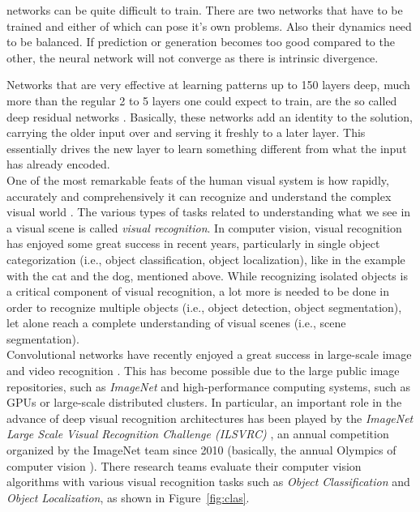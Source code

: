 \documentclass[12pt,a4paper]{report}
\newcommand{\term}{\textit}
\newcommand{\acronym}{\MakeUppercase}
\begin{document}
	networks can be quite difficult to train. There are two networks that have to be 
	trained and either of which can pose it’s own problems. Also their dynamics need 
	to be balanced. If prediction or generation becomes too good compared to the other, 
	the neural network will not converge as there is intrinsic divergence.
	\par
	Networks that are very effective at learning patterns up to 150 layers deep, much 
	more than the regular 2 to 5 layers one could expect to train, are the so called 
	deep residual networks \citep{He_resnet}. Basically, these networks add an identity 
	to the solution, carrying the older input over and serving it freshly to a later 
	layer. This essentially drives the new layer to learn something different from what 
	the input has already encoded. 
	\\
	
	One of the most remarkable feats of the human visual system is how rapidly, 
	accurately and comprehensively it can recognize and understand the complex visual 
	world \citep{Socher}. The various types of tasks related to understanding what 
	we see in a visual scene is called \term{visual recognition}. In computer vision, 
	visual recognition has enjoyed some great success in recent years, particularly 
	in single object categorization (i.e., object classification, object localization), 
	like in the example with the cat and the dog, mentioned above. 
	While recognizing isolated objects is a critical component of visual recognition, 
	a lot more is needed to be done in order to recognize multiple objects (i.e., 
	object detection, object segmentation), let alone reach a complete understanding 
	of visual scenes (i.e., scene segmentation).
	\\
	
	Convolutional networks have recently enjoyed a great success in large-scale image 
	and video recognition \citep{Simonyan_vgg}. This has become possible due to the large 
	public image repositories, such as \term{ImageNet} \citep{Deng} and high-performance 
	computing systems, such as \acronym{gpu}s or large-scale distributed clusters. In 
	particular, an important role in the advance of deep visual recognition architectures 
	has been played by the \term{ImageNet Large Scale Visual Recognition Challenge 
	(\acronym{ilsvrc})} \citep{Russakovsky}, an annual competition organized by the 
	ImageNet team since 2010 (basically, the annual Olympics of computer vision \citep{Deshpande}). 
	There research teams evaluate their computer vision algorithms with various visual 
	recognition tasks such as \term{Object Classification} and \term{Object Localization}, 
	as shown in Figure~\ref{fig:clas}.
	\\
	
\end{document}
